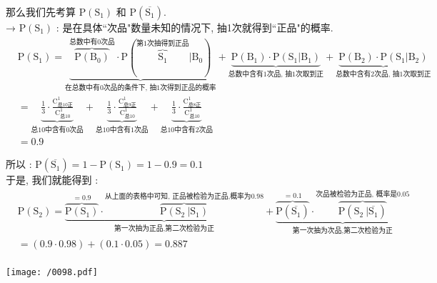 \documentclass[UTF8]{ctexart}
\begin{document}
\begin{myEnvSample}
	那么我们先考算 $	\text{P}\left( \text{S}_1 \right) 	$ 和	$	\text{P}\left( \overline{\text{S}_1} \right) 	$. \\
	
	→ $	\text{P}\left( \text{S}_1 \right) 	$ : 是在具体``次品"数量未知的情况下, 抽1次就得到``正品"的概率. \\
	\begin{align*}  %
&	\text{P}\left( \text{S}_1 \right) =\underset{\text{在总数中有0次品的条件下,\ 抽1次得到正品的概率}}{\underbrace{\overset{\text{总数中有0次品}}{\overbrace{\text{P}\left( \text{B}_0 \right) }}\cdot \text{P}\left( \overset{\text{第1次抽得到正品}}{\overbrace{\text{S}_1}}|\text{B}_0 \right) }}+\underset{\text{总数中含有1次品,\ 抽1次取到正}}{\underbrace{\text{P}\left( \text{B}_1 \right) \cdot \text{P}\left( \text{S}_1|\text{B}_1 \right) }}+\underset{\text{总数中含有2次品,\ 抽1次取到正}}{\underbrace{\text{P}\left( \text{B}_2 \right) \cdot \text{P}\left( \text{S}_1|\text{B}_2 \right) }}\\
&=\underset{\text{总10中含有0次品}}{\underbrace{\frac{1}{3}\cdot \frac{\text{C}_{\text{总10正}}^{1}}{\text{C}_{\text{总}10}^{1}}}}+\underset{\text{总10中含有1次品}}{\underbrace{\frac{1}{3}\cdot \frac{\text{C}_{\text{总9正}}^{1}}{\text{C}_{\text{总}10}^{1}}}}+\underset{\text{总10中含有2次品}}{\underbrace{\frac{1}{3}\cdot \frac{\text{C}_{\text{总8正}}^{1}}{\text{C}_{\text{总}10}^{1}}}}\\
&=0.9  
	\end{align*} 	

	所以 : $
	\text{P}\left( \overline{\text{S}_1} \right) =1-\text{P}\left( \text{S}_1 \right) =1-0.9=0.1
	$ \\
	
	于是, 我们就能得到 : \\
	\begin{align*}  %
	&\text{P}\left( \text{S}_2 \right) =\underset{\text{第一次抽为正品,第二次检验为正}}{\underbrace{\overset{=0.9}{\overbrace{\text{P}\left( \text{S}_1 \right) }}\cdot \overset{\text{从上面的表格中可知,\ 正品被检验为正品,概率为}0.98}{\overbrace{\text{P}\left( \text{S}_2\ |\text{S}_1 \right) }}}}+\underset{\text{第一次抽为次品,第二次检验为正}}{\underbrace{\overset{=0.1}{\overbrace{\text{P}\left( \overline{\text{S}_1} \right) }}\cdot \overset{\text{次品被检验为正品,\ 概率是}0.05}{\overbrace{\text{P}\left( \text{S}_2\ |\overline{\text{S}_1} \right) }}}}\\
&=\left( 0.9\cdot 0.98 \right) +\left( 0.1\cdot 0.05 \right) =0.887\\
	\end{align*}

\texttt{[image: /0098.pdf]}
\end{myEnvSample}
\end{document}
